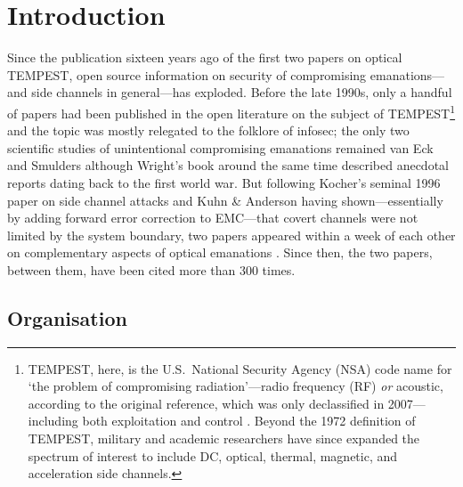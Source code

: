 \documentclass[conference]{IEEEtran}
\begin{document}
\title{}

\author{
}

\maketitle

\begin{abstract}
	
\end{abstract}

\section{Introduction}

Since the publication sixteen years ago of the first two papers on optical
TEMPEST, open source information on security of compromising emanations---and
side channels in general---has exploded. Before the late 1990s, only a
handful of papers had been published in the open literature on the subject of
TEMPEST\footnote{TEMPEST, here, is the U.S.\ National Security Agency (NSA)
code name for `the problem of compromising radiation'---radio frequency (RF)
\emph{or} acoustic, according to the original reference, which was only
declassified in 2007---including both exploitation and control
\cite{NSATempest2007}. Beyond the 1972 definition of TEMPEST, military and
academic researchers have since expanded the spectrum of interest to include
DC, optical, thermal, magnetic, and acceleration side channels.} and the
topic was mostly relegated to the folklore of infosec; the only two
scientific studies of unintentional compromising emanations remained van Eck
\cite{vanEck1985} and Smulders \cite{Smulders1990} although Wright's book
around the same time \cite{Wright1987} described anecdotal reports dating
back to the first world war. But following Kocher's seminal 1996 paper on
side channel attacks \cite{Kocher1996} and Kuhn \& Anderson \cite{Kuhn1998a}
having shown---essentially by adding forward error correction to EMC---that
covert channels were not limited by the system boundary, two papers appeared
within a week of each other on complementary aspects of optical emanations
\cite{Kuhn2002,Loughry2002a}. Since then, the two papers, between them, have
been cited more than 300 times.

\subsection{Organisation}
\end{document}
